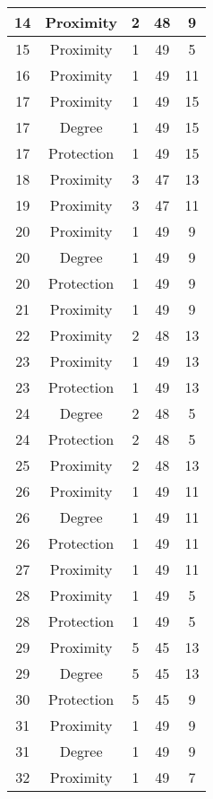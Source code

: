 \documentclass[results.tex]{subfiles}
\begin{document}
\begin{center}
\begin{tabular}{| c || c | c | c | c |}
    \hline
    14 & Proximity & 2 & 48 & 9 \\ 
    \hline
    15 & Proximity & 1 & 49 & 5 \\ 
    \hline
    16 & Proximity & 1 & 49 & 11 \\ 
    \hline
    17 & Proximity & 1 & 49 & 15 \\ 
    \hline
    17 & Degree & 1 & 49 & 15 \\ 
    \hline
    17 & Protection & 1 & 49 & 15 \\ 
    \hline
    18 & Proximity & 3 & 47 & 13 \\ 
    \hline
    19 & Proximity & 3 & 47 & 11 \\ 
    \hline
    20 & Proximity & 1 & 49 & 9 \\ 
    \hline
    20 & Degree & 1 & 49 & 9 \\ 
    \hline
    20 & Protection & 1 & 49 & 9 \\ 
    \hline
    21 & Proximity & 1 & 49 & 9 \\ 
    \hline
    22 & Proximity & 2 & 48 & 13 \\ 
    \hline
    23 & Proximity & 1 & 49 & 13 \\ 
    \hline
    23 & Protection & 1 & 49 & 13 \\ 
    \hline
    24 & Degree & 2 & 48 & 5 \\ 
    \hline
    24 & Protection & 2 & 48 & 5 \\ 
    \hline
    25 & Proximity & 2 & 48 & 13 \\ 
    \hline
    26 & Proximity & 1 & 49 & 11 \\ 
    \hline
    26 & Degree & 1 & 49 & 11 \\ 
    \hline
    26 & Protection & 1 & 49 & 11 \\ 
    \hline
    27 & Proximity & 1 & 49 & 11 \\ 
    \hline
    28 & Proximity & 1 & 49 & 5 \\ 
    \hline
    28 & Protection & 1 & 49 & 5 \\ 
    \hline
    29 & Proximity & 5 & 45 & 13 \\ 
    \hline
    29 & Degree & 5 & 45 & 13 \\ 
    \hline
    30 & Protection & 5 & 45 & 9 \\ 
    \hline
    31 & Proximity & 1 & 49 & 9 \\ 
    \hline
    31 & Degree & 1 & 49 & 9 \\ 
    \hline
    32 & Proximity & 1 & 49 & 7 \\ 

\end{tabular}
\end{center}
\end{document}

